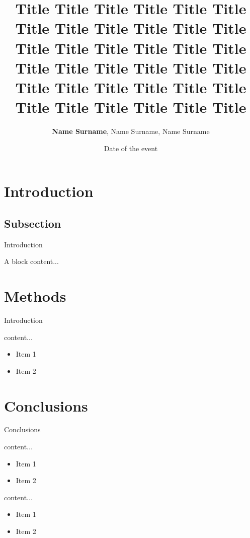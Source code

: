 \documentclass[10pt, aspectratio=169, handout]{uniudprestkz}
\author{\textbf{Name Surname}, Name Surname, Name Surname}
\affiliation{Affil1, Affil2}
\title{Title Title Title Title Title Title Title Title Title Title Title Title Title Title Title Title Title Title Title Title Title Title Title Title Title Title Title Title Title Title Title Title Title Title Title Title }
\date{Date of the event}
\begin{document}
	
	\maketitle

	\section{Introduction}
	\subsection{Subsection}
	\begin{frame}{Introduction}
		\onslide<2->\begin{blox}{A block}
			content...
		\end{blox}
	\end{frame}
	
	\section{Methods}
	\begin{frame}{Introduction}
		\begin{block}{content...}
			\begin{itemize}
				\item Item 1
				\item Item 2
			\end{itemize}
		\end{block}
	\end{frame}
	
	\section{Conclusions}
	\begin{frame}{Conclusions}
		\begin{block}{content...}
			\begin{itemize}
				\item Item 1
				\item Item 2
			\end{itemize}
		\end{block}
		
		\begin{block}{content...}
			\begin{itemize}
				\item Item 1
				\item Item 2
			\end{itemize}
		\end{block}
	\end{frame}
\end{document}
